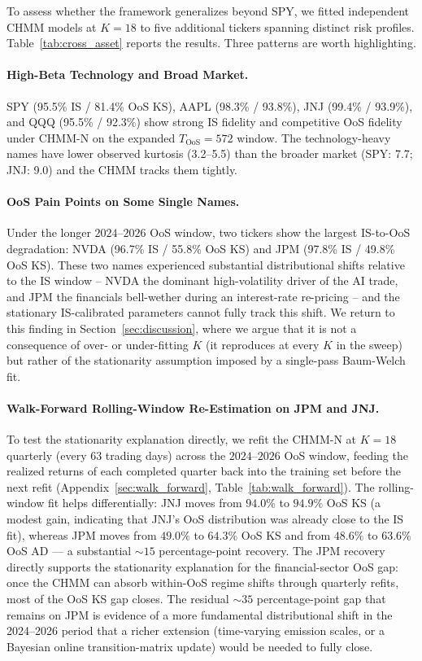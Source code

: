 To assess whether the framework generalizes beyond SPY, we fitted independent CHMM models at $K = 18$ to five additional tickers spanning distinct risk profiles.
Table~\ref{tab:cross_asset} reports the results.
Three patterns are worth highlighting.

\paragraph{High-Beta Technology and Broad Market.}
SPY (95.5\% IS / 81.4\% OoS KS), AAPL (98.3\% / 93.8\%), JNJ (99.4\% / 93.9\%), and QQQ (95.5\% / 92.3\%) show strong IS fidelity and competitive OoS fidelity under CHMM-N on the expanded $T_{\text{OoS}} = 572$ window.
The technology-heavy names have lower observed kurtosis (3.2--5.5) than the broader market (SPY: 7.7; JNJ: 9.0) and the CHMM tracks them tightly.

\paragraph{OoS Pain Points on Some Single Names.}
Under the longer $2024$--$2026$ OoS window, two tickers show the largest IS-to-OoS degradation: NVDA (96.7\% IS / 55.8\% OoS KS) and JPM (97.8\% IS / 49.8\% OoS KS).
These two names experienced substantial distributional shifts relative to the IS window -- NVDA the dominant high-volatility driver of the AI trade, and JPM the financials bell-wether during an interest-rate re-pricing -- and the stationary IS-calibrated parameters cannot fully track this shift.
We return to this finding in Section~\ref{sec:discussion}, where we argue that it is not a consequence of over- or under-fitting $K$ (it reproduces at every $K$ in the sweep) but rather of the stationarity assumption imposed by a single-pass Baum-Welch fit.

\paragraph{Walk-Forward Rolling-Window Re-Estimation on JPM and JNJ.}
To test the stationarity explanation directly, we refit the CHMM-N at $K = 18$ quarterly (every $63$ trading days) across the $2024$--$2026$ OoS window, feeding the realized returns of each completed quarter back into the training set before the next refit (Appendix~\ref{sec:walk_forward}, Table~\ref{tab:walk_forward}).
The rolling-window fit helps differentially: JNJ moves from $94.0\%$ to $94.9\%$ OoS KS (a modest gain, indicating that JNJ's OoS distribution was already close to the IS fit), whereas JPM moves from $49.0\%$ to $64.3\%$ OoS KS and from $48.6\%$ to $63.6\%$ OoS AD --- a substantial $\sim 15$ percentage-point recovery.
The JPM recovery directly supports the stationarity explanation for the financial-sector OoS gap: once the CHMM can absorb within-OoS regime shifts through quarterly refits, most of the OoS KS gap closes.
The residual $\sim 35$ percentage-point gap that remains on JPM is evidence of a more fundamental distributional shift in the 2024--2026 period that a richer extension (time-varying emission scales, or a Bayesian online transition-matrix update) would be needed to fully close.

